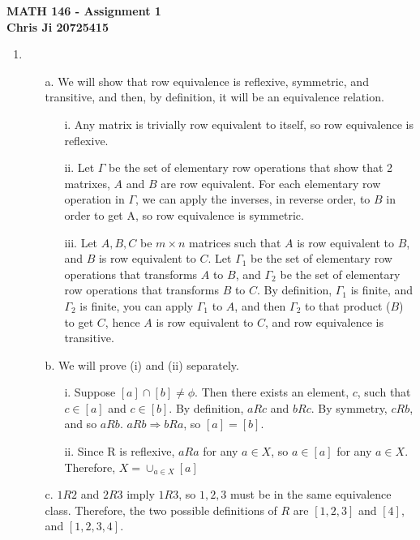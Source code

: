 \documentclass[10pt,english]{article}
\begin{document}
\noindent \begin{center}
\textbf{\large{}MATH 146 - Assignment 1}\\
\textbf{\large{}Chris Ji 20725415}
\par\end{center}{\large \par}
\medskip{}

\begin{enumerate}
\item 
\begin{enumerate}

\item [a.] We will show that row equivalence is reflexive, symmetric, and transitive, and then, by definition, it will be an equivalence relation. 
\begin{enumerate}
    \item [i.] Any matrix is trivially row equivalent to itself, so row equivalence is reflexive. 
    \item [ii.] Let $\Gamma$ be the set of elementary row operations that show that 2 matrixes, $A$ and $B$ are row equivalent. For each elementary row operation in $\Gamma$, we can apply the inverses, in reverse order, to $B$ in order to get A, so row equivalence is symmetric. 
    \item [iii.] Let $A,B,C$ be $m\times n$ matrices such that $A$ is row equivalent to $B$, and $B$ is row equivalent to $C$. Let $\Gamma_1$ be the set of elementary row operations that transforms $A$ to $B$, and $\Gamma_2$ be the set of elementary row operations that transforms $B$ to $C$. By definition, $\Gamma_1$ is finite, and $\Gamma_2$ is finite, you can apply $\Gamma_1$  to $A$, and then $\Gamma_2$ to that product ($B$) to get $C$, hence $A$ is row equivalent to $C$, and row equivalence is transitive. 
\end{enumerate}
\item [b.] We will prove (i) and (ii) separately. \begin{enumerate}
    \item [i.] Suppose $[a]\cap[b]\neq\phi$. Then there exists an element, $c$, such that $c\in[a]$ and $c\in[b]$. By definition, $aRc$ and $bRc$. By symmetry, $cRb$, and so $aRb$. $aRb\Rightarrow bRa$, so $[a]=[b]$. 
    \item [ii.] Since R is reflexive, $aRa$ for any $a\in X$, so $a\in [a]$ for any $a\in X$. Therefore, $X=\cup_{a\in X}[a]$
\end{enumerate}
\item [c.] $1R2$ and $2R3$ imply $1R3$, so $1,2,3$ must be in the same equivalence class. Therefore, the two possible definitions of $R$ are $[1,2,3]$ and $[4]$, and $[1,2,3,4]$. 

\end{enumerate}
\end{enumerate}
\end{document}
